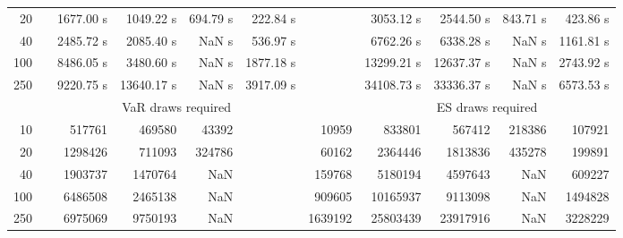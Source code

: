 {{\begin{longtable}{rr rrrr r rrrr}
20 & & 1677.00 s & 1049.22 s & 694.79 s & 222.84 s && 3053.12 s & 2544.50 s & 843.71 s & 423.86 s \\ 
40 & & 2485.72 s & 2085.40 s &  NaN s & 536.97 s && 6762.26 s & 6338.28 s &  NaN s & 1161.81 s \\ 
100 & & 8486.05 s & 3480.60 s &  NaN s & 1877.18 s && 13299.21 s & 12637.37 s &  NaN s & 2743.92 s \\ 
250 & & 9220.75 s & 13640.17 s &  NaN s & 3917.09 s && 34108.73 s & 33336.37 s &  NaN s & 6573.53 s \\ 
\hline 
 && \multicolumn{4}{c}{VaR draws required} &&   \multicolumn{4}{c}{ES draws required} \\  \cline{3-6}  \cline{8-11} 
10 & & 517761 & 469580 & 43392 & & 10959 & 833801 & 567412 & 218386  & 107921 \\ 
20 & & 1298426 & 711093 & 324786 & & 60162 & 2364446 & 1813836 & 435278  & 199891 \\ 
40 & & 1903737 & 1470764 & NaN & & 159768 & 5180194 & 4597643 & NaN  & 609227 \\ 
100 & & 6486508 & 2465138 & NaN & & 909605 & 10165937 & 9113098 & NaN  & 1494828 \\ 
250 & & 6975069 & 9750193 & NaN & & 1639192 & 25803439 & 23917916 & NaN  & 3228229 \\ 
\hline 
\end{longtable} 
} 
} 
